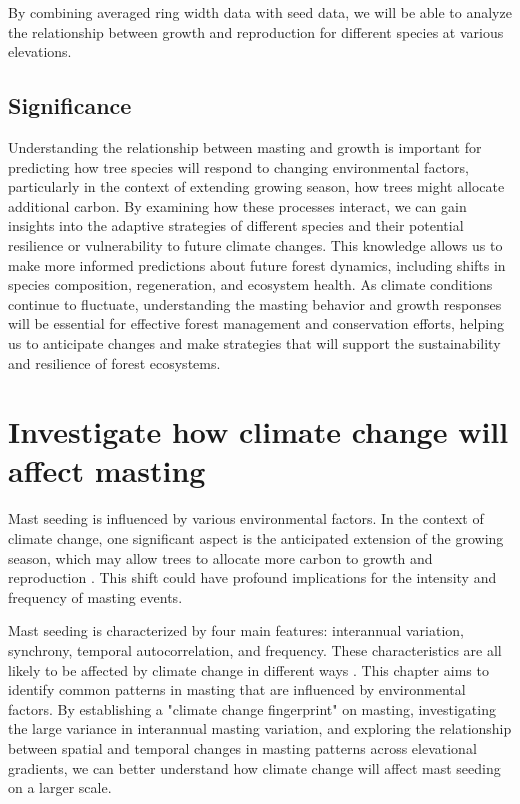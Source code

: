 \documentclass[11pt,letter]{article}
\begin{document}
By combining averaged ring width data with seed data, we will be able to analyze the relationship between growth and reproduction for different species at various elevations.

\subsection{Significance}
Understanding the relationship between masting and growth is important for predicting how tree species will respond to changing environmental factors, particularly in the context of extending growing season, how trees might allocate additional carbon. By examining how these processes interact, we can gain insights into the adaptive strategies of different species and their potential resilience or vulnerability to future climate changes. This knowledge allows us to make more informed predictions about future forest dynamics, including shifts in species composition, regeneration, and ecosystem health. As climate conditions continue to fluctuate, understanding the  masting behavior and growth responses will be essential for effective forest management and conservation efforts, helping us to anticipate changes and make strategies that will support the sustainability and resilience of forest ecosystems.

\section{Investigate how climate change will affect masting} %
Mast seeding is influenced by various environmental factors. In the context of climate change, one significant aspect is the anticipated extension of the growing season, which may allow trees to allocate more carbon to growth and reproduction \citep{keenan2014net}. This shift could have profound implications for the intensity and frequency of masting events.

Mast seeding is characterized by four main features: interannual variation, synchrony, temporal autocorrelation, and frequency. These characteristics are all likely to be affected by climate change in different ways \citep{hacket2021climate}. This chapter aims to identify common patterns in masting that are influenced by environmental factors. By establishing a "climate change fingerprint" on masting, investigating the large variance in interannual masting variation, and exploring the relationship between spatial and temporal changes in masting patterns across elevational gradients, we can better understand how climate change will affect mast seeding on a larger scale.
\end{document}
